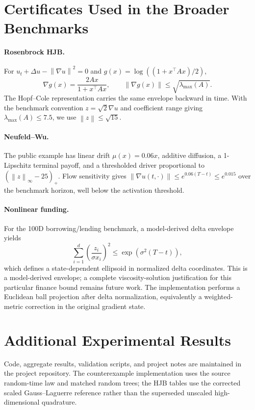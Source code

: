 \documentclass{article}
\newcommand{\norm}[1]{\left\lVert #1\right\rVert}
\begin{document}
\section{Certificates Used in the Broader Benchmarks}
\label{app:certificates}
\paragraph{Rosenbrock HJB.}
For $u_t+\Delta u-\norm{\nabla u}^2=0$ and $g(x)=\log((1+x^\top Ax)/2)$,
\[
\nabla g(x)=\frac{2Ax}{1+x^\top Ax},\qquad
\norm{\nabla g(x)}\le\sqrt{\lambda_{\max}(A)}.
\]
The Hopf--Cole representation carries the same envelope backward in time. With the benchmark convention $z=\sqrt2\nabla u$ and coefficient range giving $\lambda_{\max}(A)\le7.5$, we use $\norm z\le\sqrt{15}$.

\paragraph{Neufeld--Wu.}
The public example has linear drift $\mu(x)=0.06x$, additive diffusion, a 1-Lipschitz terminal payoff, and a thresholded driver proportional to $(\norm z_\infty-25)_+$. Flow sensitivity gives $\norm{\nabla u(t,\cdot)}\le e^{0.06(T-t)}\le e^{0.015}$ over the benchmark horizon, well below the activation threshold.

\paragraph{Nonlinear funding.}
For the 100D borrowing/lending benchmark, a model-derived delta envelope yields
\[
\sum_{i=1}^d\left(\frac{z_i}{\sigma x_i}\right)^2
\le \exp(\sigma^2(T-t)),
\]
which defines a state-dependent ellipsoid in normalized delta coordinates. This is a model-derived envelope; a complete viscosity-solution justification for this particular finance bound remains future work. The implementation performs a Euclidean ball projection after delta normalization, equivalently a weighted-metric correction in the original gradient state.

\section{Additional Experimental Results}
\label{app:experiments}
Code, aggregate results, validation scripts, and project notes are maintained in the project repository. The counterexample implementation uses the source random-time law and matched random trees; the HJB tables use the corrected scaled Gauss--Laguerre reference rather than the superseded unscaled high-dimensional quadrature.
\end{document}
